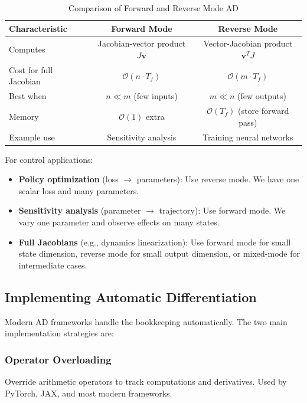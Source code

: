 \begin{table}[htbp]
\centering
\caption{Comparison of Forward and Reverse Mode AD}
\label{tab:ad_comparison}
\begin{tabular}{lcc}
\toprule
\textbf{Characteristic} & \textbf{Forward Mode} & \textbf{Reverse Mode} \\
\midrule
Computes & Jacobian-vector product $J\mathbf{v}$ & Vector-Jacobian product $\mathbf{v}^T J$ \\
Cost for full Jacobian & $\mathcal{O}(n \cdot T_f)$ & $\mathcal{O}(m \cdot T_f)$ \\
Best when & $n \ll m$ (few inputs) & $m \ll n$ (few outputs) \\
Memory & $\mathcal{O}(1)$ extra & $\mathcal{O}(T_f)$ (store forward pass) \\
Example use & Sensitivity analysis & Training neural networks \\
\bottomrule
\end{tabular}
\end{table}

For control applications:
\begin{itemize}
    \item \textbf{Policy optimization} (loss $\to$ parameters): Use reverse mode. We have one scalar loss and many parameters.
    \item \textbf{Sensitivity analysis} (parameter $\to$ trajectory): Use forward mode. We vary one parameter and observe effects on many states.
    \item \textbf{Full Jacobians} (e.g., dynamics linearization): Use forward mode for small state dimension, reverse mode for small output dimension, or mixed-mode for intermediate cases.
\end{itemize}

\subsection{Implementing Automatic Differentiation}

Modern AD frameworks handle the bookkeeping automatically. The two main implementation strategies are:

\subsubsection{Operator Overloading}

Override arithmetic operators to track computations and derivatives. Used by PyTorch, JAX, and most modern frameworks.

